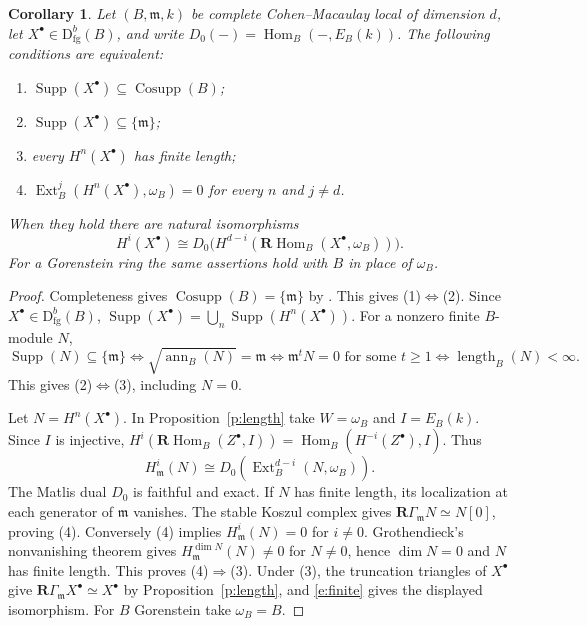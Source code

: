 \documentclass[11pt,reqno]{amsart}
\newtheorem{corollary}[theorem]{Corollary}
\theoremstyle{definition}
\DeclareMathOperator{\Cosupp}{Cosupp}
\DeclareMathOperator{\Supp}{Supp}
\DeclareMathOperator{\Hom}{Hom}
\DeclareMathOperator{\Ext}{Ext}
\newcommand{\D}{\mathrm D}
\newcommand{\m}{\mathfrak m}
\newcommand{\RHom}{\mathbf R\!\operatorname{Hom}}
\newcommand{\RG}{\mathbf R\Gamma}
\newcommand{\fg}{\mathrm{fg}}
\numberwithin{equation}{section}
\begin{document}
\begin{corollary}\label{c:finite}
Let $(B,\m,k)$ be complete Cohen--Macaulay local of dimension $d$, let $X^\bullet\in\D^b_{\fg}(B)$, and write $D_0(-)=\Hom_B(-,E_B(k))$. The following conditions are equivalent:
\begin{enumerate}
\item $\Supp(X^\bullet)\subseteq\Cosupp(B)$;
\item $\Supp(X^\bullet)\subseteq\{\m\}$;
\item every $H^n(X^\bullet)$ has finite length;
\item $\Ext^j_B(H^n(X^\bullet),\omega_B)=0$ for every $n$ and $j\ne d$.
\end{enumerate}
When they hold there are natural isomorphisms
\[
 H^i(X^\bullet)\cong D_0\big(H^{d-i}(\RHom_B(X^\bullet,\omega_B))\big).
\]
For a Gorenstein ring the same assertions hold with $B$ in place of $\omega_B$.
\end{corollary}
\begin{proof}
Completeness gives $\Cosupp(B)=\{\m\}$ by \cite[Proposition~4.19 and Example~4.20]{bik}. This gives (1)$\iff$(2). Since $X^\bullet\in\D^b_{\fg}(B)$, $\Supp(X^\bullet)=\bigcup_n\Supp(H^n(X^\bullet))$. For a nonzero finite $B$-module $N$,
\[
 \Supp(N)\subseteq\{\m\}\iff\sqrt{\operatorname{ann}_B(N)}=\m
 \iff \m^tN=0\text{ for some }t\ge1
 \iff \operatorname{length}_B(N)<\infty .
\]
This gives (2)$\iff$(3), including $N=0$.

Let $N=H^n(X^\bullet)$. In Proposition~\ref{p:length} take $W=\omega_B$ and $I=E_B(k)$. Since $I$ is injective, $H^i(\RHom_B(Z^\bullet,I))=\Hom_B(H^{-i}(Z^\bullet),I)$. Thus
\[
 H^i_{\m}(N)\cong D_0(\Ext_B^{d-i}(N,\omega_B)).
\]
The Matlis dual $D_0$ is faithful and exact. If $N$ has finite length, its localization at each generator of $\m$ vanishes. The stable Koszul complex gives $\RG_{\m}N\simeq N[0]$, proving (4). Conversely (4) implies $H^i_{\m}(N)=0$ for $i\ne0$. Grothendieck's nonvanishing theorem \cite[Theorem~3.5.7]{bh} gives $H^{\dim N}_{\m}(N)\ne0$ for $N\ne0$, hence $\dim N=0$ and $N$ has finite length. This proves (4)$\Rightarrow$(3). Under (3), the truncation triangles of $X^\bullet$ give $\RG_{\m}X^\bullet\simeq X^\bullet$ by Proposition~\ref{p:length}, and \eqref{e:finite} gives the displayed isomorphism. For $B$ Gorenstein take $\omega_B=B$.
\end{proof}
\end{document}
